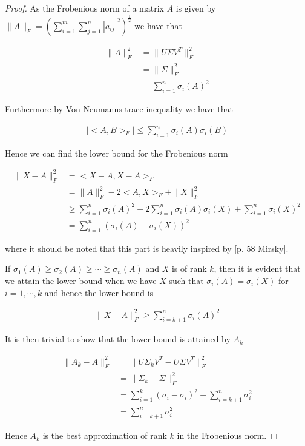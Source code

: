 \documentclass[11pt,a4paper,english]{elsarticle}%
\begin{document}
\begin{proof}
  As the Frobenious norm of a matrix $A$ is given by $\|A\|_F = (\sum_{i=1}^m \sum_{j=1}^n |a_{ij}|^2)^{\frac{1}{2}}$ we have that

  \begin{align*}
    \|A\|_F^2 &= \|U\Sigma V^T\|_F^2 \\
    &=\|\Sigma \|_F^2 \\
    &= \sum_{i=1}^n \sigma_i(A)^2
  \end{align*}

  Furthermore by Von Neumanns trace inequality we have that

  \begin{align*}
    |<A,B>_F| \leq \sum_{i=1}^n \sigma_i(A)\sigma_i(B)
  \end{align*}

  Hence we can find the lower bound for the Frobenious norm

  \begin{align*}
    \|X-A\|_F^2 &= <X-A,X-A>_F \\
    &= \|A\|_F^2 - 2<A,X>_F + \|X\|^2_F\\
    &\geq \sum_{i=1}^n \sigma_i(A)^2 -2\sum_{i=1}^n\sigma_i(A)\sigma_i(X) + \sum_{i=1}^n \sigma_i(X)^2 \\
    &= \sum_{i=1}^n(\sigma_i(A) - \sigma_i(X))^2
  \end{align*}

  \noindent where it should be noted that this part is heavily inspired by [p. 58 Mirsky]\cite{Mirsky}.

  If $\sigma_1(A) \geq \sigma_2(A) \geq \cdots \geq \sigma_n(A)$ and $X$ is of rank $k$, then it is evident that we attain the lower bound when we have $X$ such that $\sigma_i(A) = \sigma_i(X)$ for $i = 1,\cdots,k$ and hence the lower bound is

  \begin{align*}
    \|X-A\|^2_F \geq \sum_{i=k+1}^n \sigma_i(A)^2
  \end{align*}

  It is then trivial to show that the lower bound is attained by $A_k$

  \begin{align*}
    \|A_k - A\|_F^2 &= \|U\Sigma_kV^T - U\Sigma V^T\|_F^2 \\
    &= \|\Sigma_k - \Sigma \|_F^2 \\
    &= \sum_{i = 1}^k (\bar \sigma_i - \sigma_i)^2 + \sum_{i = k+1}^n \sigma_i^2 \\
    &= \sum_{i = k+1}^n \sigma_i^2
  \end{align*}

  Hence $A_k$ is the best approximation of rank $k$ in the Frobenious norm.
\end{proof}
\end{document}
